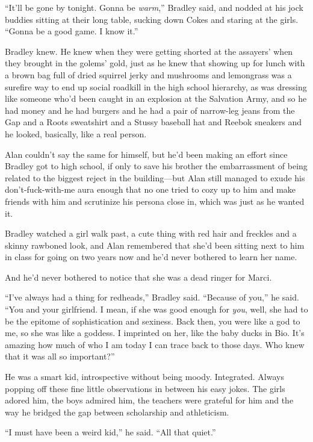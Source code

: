 \documentclass{article}
\begin{document}
``It'll be gone by tonight.  Gonna be \textit{warm},'' Bradley said,
and nodded at his jock buddies sitting at their long table, sucking
down Cokes and staring at the girls.  ``Gonna be a good game.  I know
it.''

Bradley knew.  He knew when they were getting shorted at the assayers'
when they brought in the golems' gold, just as he knew that showing up
for lunch with a brown bag full of dried squirrel jerky and mushrooms
and lemongrass was a surefire way to end up social roadkill in the
high school hierarchy, as was dressing like someone who'd been caught
in an explosion at the Salvation Army, and so he had money and he had
burgers and he had a pair of narrow-leg jeans from the Gap and a Roots
sweatshirt and a Stussy baseball hat and Reebok sneakers and he
looked, basically, like a real person.

Alan couldn't say the same for himself, but he'd been making an effort
since Bradley got to high school, if only to save his brother the
embarrassment of being related to the biggest reject in the
building---but Alan still managed to exude his don't-fuck-with-me aura
enough that no one tried to cozy up to him and make friends with him
and scrutinize his persona close in, which was just as he wanted it.

Bradley watched a girl walk past, a cute thing with red hair and
freckles and a skinny rawboned look, and Alan remembered that she'd
been sitting next to him in class for going on two years now and he'd
never bothered to learn her name.

And he'd never bothered to notice that she was a dead ringer for
Marci.

``I've always had a thing for redheads,'' Bradley said.  ``Because of
you,'' he said.  ``You and your girlfriend.  I mean, if she was good
enough for \textit{you}, well, she had to be the epitome of
sophistication and sexiness.  Back then, you were like a god to me, so
she was like a goddess.  I imprinted on her, like the baby ducks in
Bio.  It's amazing how much of who I am today I can trace back to
those days.  Who knew that it was all so important?''

He was a smart kid, introspective without being moody.  Integrated. 
Always popping off these fine little observations in between his easy
jokes.  The girls adored him, the boys admired him, the teachers were
grateful for him and the way he bridged the gap between scholarship
and athleticism.

``I must have been a weird kid,'' he said.  ``All that quiet.''
\end{document}
